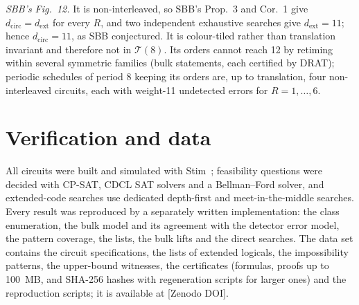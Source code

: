\documentclass[aps,prl,twocolumn,superscriptaddress,nofootinbib]{revtex4-2}
\newcommand{\dcirc}{d_{\mathrm{circ}}}
\newcommand{\dext}{d_{\mathrm{ext}}}
\newcommand{\T}{\mathcal{T}}
\begin{document}
\emph{SBB's Fig.~12.} It is non-interleaved, so SBB's Prop.~3 and Cor.~1 give
$\dcirc=\dext$ for every $R$, and two independent exhaustive searches give $\dext=11$; hence
$\dcirc=11$, as SBB conjectured. It is colour-tiled rather than translation invariant and
therefore not in $\T(8)$. Its orders cannot reach 12 by retiming within several symmetric
families (bulk statements, each certified by DRAT); periodic schedules of period 8 keeping
its orders are, up to translation, four non-interleaved circuits, each with weight-11
undetected errors for $R=1,\dots,6$.

\section{Verification and data}\label{sm:data}
All circuits were built and simulated with Stim~\cite{Gidney2021stim}; feasibility
questions were decided with CP-SAT, CDCL SAT solvers and a Bellman--Ford solver, and
extended-code searches use dedicated depth-first and meet-in-the-middle searches. Every
result was reproduced by a separately written implementation: the class enumeration, the
bulk model and its agreement with the detector error model, the pattern coverage, the
lists, the bulk lifts and the direct searches. The data set contains the circuit
specifications, the lists of extended logicals, the impossibility patterns, the upper-bound
witnesses, the certificates (formulas, proofs up to 100~MB, and SHA-256 hashes with
regeneration scripts for larger ones) and the reproduction scripts; it is available at
[Zenodo DOI].
\end{document}
